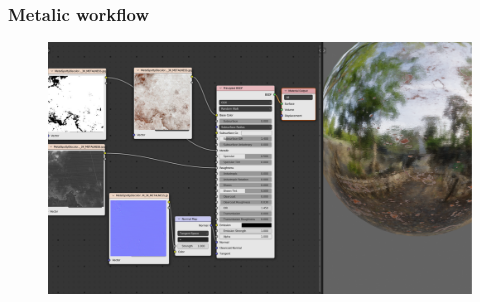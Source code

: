 \begin{frame}\frametitle{Metalic workflow}
  \begin{figure}[ht]
    \includegraphics[width=\textwidth]{pics/physicallyBasedRendering/metal/metal_workflow}
  \end{figure}
\end{frame}

